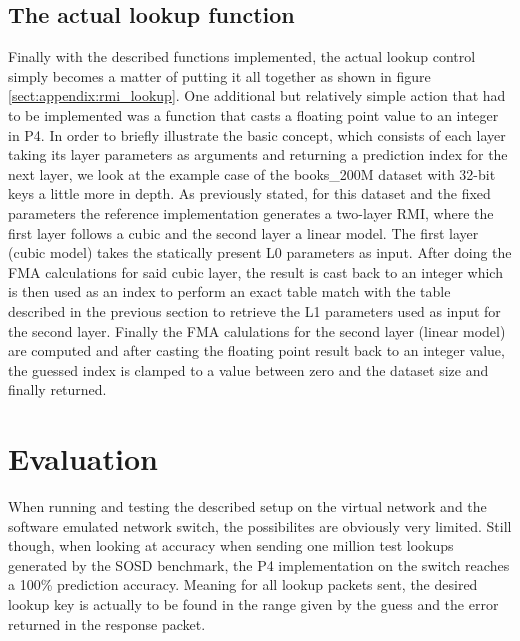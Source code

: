 \subsection{The actual lookup function}
Finally with the described functions implemented, the actual lookup control simply becomes a matter of putting it all together as shown in figure \ref{sect:appendix:rmi_lookup}. One additional but relatively simple action that had to be implemented was a function that casts a floating point value to an integer in P4. In order to briefly illustrate the basic concept, which consists of each layer taking its layer parameters as arguments and returning a prediction index for the next layer, we look at the example case of the books\_200M dataset with 32-bit keys a little more in depth. As previously stated, for this dataset and the fixed parameters the reference implementation generates a two-layer RMI, where the first layer follows a cubic and the second layer a linear model. The first layer (cubic model) takes the statically present L0 parameters as input. After doing the FMA calculations for said cubic layer, the result is cast back to an integer which is then used as an index to perform an exact table match with the table described in the previous section to retrieve the L1 parameters used as input for the second layer. Finally the FMA calulations for the second layer (linear model) are computed and after casting the floating point result back to an integer value, the guessed index is clamped to a value between zero and the dataset size and finally returned.

\section{Evaluation}
\label{sect:rmionbmv2:evaluation}
When running and testing the described setup on the virtual network and the software emulated network switch, the possibilites are obviously very limited. Still though, when looking at accuracy when sending one million test lookups generated by the SOSD benchmark, the P4 implementation on the switch reaches a 100\% prediction accuracy. Meaning for all lookup packets sent, the desired lookup key is actually to be found in the range given by the guess and the error returned in the response packet.\\

